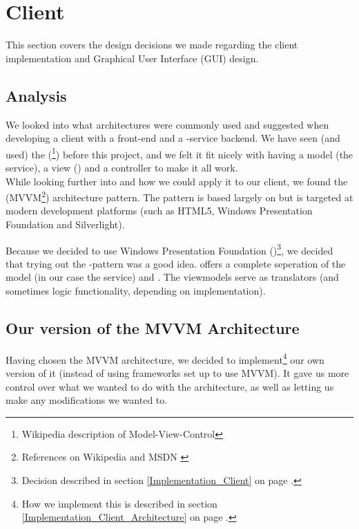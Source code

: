 \section{Client}
\label{Design_Client}
This section covers the design decisions we made regarding the client implementation and Graphical User Interface (GUI) design.
\subsection{Analysis}
\label{Design_Client_Analysis}
We looked into what architectures were commonly used and suggested when developing a client with a  front-end and a -service backend. We have seen (and used) the  (\footnote{Wikipedia description of Model-View-Control\cite{WIKI-MVC}}) before this project, and we felt it fit nicely with having a model (the service), a view () and a controller to make it all work. 
\\While looking further into  and how we could apply it to our client, we found the  (MVVM\footnote{References on Wikipedia \cite{WIKI-MVVM} and MSDN \cite{MSDN-WPF-MVVM}}) architecture pattern. The  pattern is based largely on  but is targeted at modern  development platforms (such as HTML5, Windows Presentation Foundation and Silverlight).

Because we decided to use Windows Presentation Foundation ()\footnote{Decision described in section \ref{Implementation_Client} on page \pageref{Implementation_Client}.}, we decided that trying out the -pattern was a good idea.  offers a complete seperation of the model (in our case the  service) and . The viewmodels serve as translators (and sometimes logic functionality, depending on implementation).
\subsection[Architecture]{Our version of the MVVM Architecture}
\label{Design_Client_Architecture}
Having chosen the MVVM architecture, we decided to implement\footnote{How we implement this is described in section \ref{Implementation_Client_Architecture} on page \pageref{Implementation_Client_Architecture}.} our own version of it (instead of using frameworks set up to use MVVM). It gave us more control over what we wanted to do with the architecture, as well as letting us make any modifications we wanted to.

